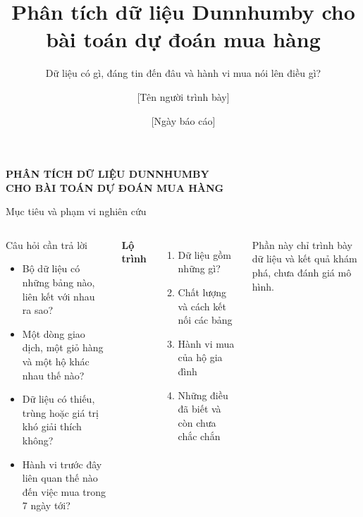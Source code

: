 \documentclass[smaller,aspectratio=169,t]{beamer}
\title{Phân tích dữ liệu Dunnhumby cho bài toán dự đoán mua hàng}
\subtitle{Dữ liệu có gì, đáng tin đến đâu và hành vi mua nói lên điều gì?}
\author{[Tên người trình bày]}
\date{[Ngày báo cáo]}
\begin{document}
\begin{frame}[plain]
\vspace{6mm}
{\color{white}\LARGE\bfseries PHÂN TÍCH DỮ LIỆU DUNNHUMBY\\[2mm]
CHO BÀI TOÁN DỰ ĐOÁN MUA HÀNG}\par
{}\par
{}
\end{frame}

\begin{frame}{Mục tiêu và phạm vi nghiên cứu}
\begin{columns}[T,onlytextwidth]
\begin{block}{Câu hỏi cần trả lời}
\begin{itemize}
\item Bộ dữ liệu có những bảng nào, liên kết với nhau ra sao?
\item Một dòng giao dịch, một giỏ hàng và một hộ khác nhau thế nào?
\item Dữ liệu có thiếu, trùng hoặc giá trị khó giải thích không?
\item Hành vi trước đây liên quan thế nào đến việc mua trong 7 ngày tới?
\end{itemize}
\end{block}
\textbf{Lộ trình}\vspace{3mm}
\begin{enumerate}
\item Dữ liệu gồm những gì?
\item Chất lượng và cách kết nối các bảng
\item Hành vi mua của hộ gia đình
\item Những điều đã biết và còn chưa chắc chắn
\end{enumerate}
\vspace{4mm}
{\small Phần này chỉ trình bày dữ liệu và kết quả khám phá, chưa đánh giá mô hình.}
\end{columns}
\end{frame}
\end{document}
